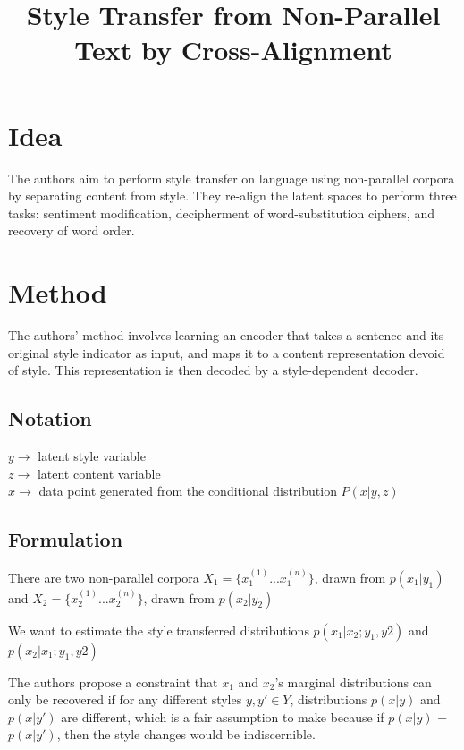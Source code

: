 \documentclass[12pt]{article}
\begin{document}
\title{Style Transfer from Non-Parallel Text by Cross-Alignment}
\author{}
\date{}
\maketitle

\section{Idea}
  The authors aim to perform style transfer on language using non-parallel corpora by separating content from style. They re-align the latent spaces to perform three tasks: sentiment modification, decipherment of word-substitution ciphers, and recovery of word order.

\section{Method}
  The authors' method involves learning an encoder that takes a sentence and its original style indicator as input, and maps it to a content representation devoid of style. This representation is then decoded by a style-dependent decoder.

  \subsection{Notation}
    $y \rightarrow$ latent style variable \\
    $z \rightarrow$ latent content variable \\
    $x \rightarrow$ data point generated from the conditional distribution $P(x|y,z)$ 

  \subsection{Formulation}
    There are two non-parallel corpora $X_1 = \{x_1^{(1)} ... x_1^{(n)} \}$, drawn from $p(x_1|y_1)$ and $X_2 = \{x_2^{(1)} ... x_2^{(n)} \}$, drawn from $p(x_2|y_2)$

    We want to estimate the style transferred distributions $p(x_1|x_2;y_1,y2)$ and $p(x_2|x_1;y_1,y2)$

    The authors propose a constraint that $x_1$ and $x_2$'s marginal distributions can only be recovered if for any different styles $y, y' \in Y$, distributions $p(x|y)$ and $p(x|y')$ are different, which is a fair assumption to make because if $p(x|y)$ = $p(x|y')$, then the style changes would be indiscernible. 
    
\end{document}
